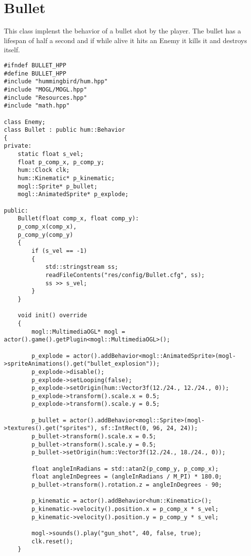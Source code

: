 \section{Bullet}

This class implenst the behavior of a bullet shot by the player. The bullet has a lifespan of 
half a second and if while alive it hits an Enemy it kills it and destroys itself.

\begin{lstlisting}
#ifndef BULLET_HPP
#define BULLET_HPP
#include "hummingbird/hum.hpp"
#include "MOGL/MOGL.hpp"
#include "Resources.hpp"
#include "math.hpp"

class Enemy;
class Bullet : public hum::Behavior
{
private:
    static float s_vel;
    float p_comp_x, p_comp_y;
    hum::Clock clk;
    hum::Kinematic* p_kinematic;
    mogl::Sprite* p_bullet;
    mogl::AnimatedSprite* p_explode;

public:
    Bullet(float comp_x, float comp_y):
    p_comp_x(comp_x),
    p_comp_y(comp_y)
    {
        if (s_vel == -1)
        {
            std::stringstream ss;
            readFileContents("res/config/Bullet.cfg", ss);
            ss >> s_vel;
        }
    }

    void init() override
    {
        mogl::MultimediaOGL* mogl = actor().game().getPlugin<mogl::MultimediaOGL>();

        p_explode = actor().addBehavior<mogl::AnimatedSprite>(mogl->spriteAnimations().get("bullet_explosion"));
        p_explode->disable();
        p_explode->setLooping(false);
        p_explode->setOrigin(hum::Vector3f(12./24., 12./24., 0));
        p_explode->transform().scale.x = 0.5;
        p_explode->transform().scale.y = 0.5;

        p_bullet = actor().addBehavior<mogl::Sprite>(mogl->textures().get("sprites"), sf::IntRect(0, 96, 24, 24));
        p_bullet->transform().scale.x = 0.5;
        p_bullet->transform().scale.y = 0.5;
        p_bullet->setOrigin(hum::Vector3f(12./24., 18./24., 0));

        float angleInRadians = std::atan2(p_comp_y, p_comp_x);
        float angleInDegrees = (angleInRadians / M_PI) * 180.0;
        p_bullet->transform().rotation.z = angleInDegrees - 90;

        p_kinematic = actor().addBehavior<hum::Kinematic>();
        p_kinematic->velocity().position.x = p_comp_x * s_vel;
        p_kinematic->velocity().position.y = p_comp_y * s_vel;

        mogl->sounds().play("gun_shot", 40, false, true);
        clk.reset();
    }
\end{lstlisting}

